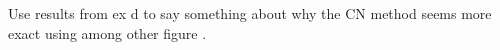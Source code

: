 Use results from ex d to say something about why the CN method
seems more exact using among other figure .
